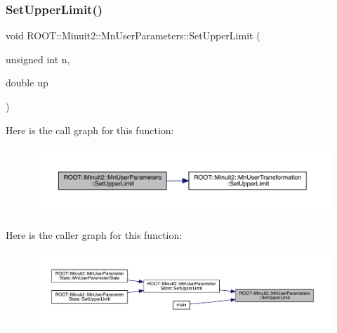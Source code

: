 \mbox{\label{classROOT_1_1Minuit2_1_1MnUserParameters_a9127811ac07731aea64f1869a620d11b}} 
\subsubsection{\texorpdfstring{SetUpperLimit()}{SetUpperLimit()}\hspace{0.1cm}{\footnotesize\ttfamily [2/4]}}
{\footnotesize\ttfamily void R\+O\+O\+T\+::\+Minuit2\+::\+Mn\+User\+Parameters\+::\+Set\+Upper\+Limit (\begin{DoxyParamCaption}\item[{unsigned int}]{n,  }\item[{double}]{up }\end{DoxyParamCaption})}

Here is the call graph for this function\+:\nopagebreak
\begin{figure}[H]
\begin{center}
\leavevmode
\includegraphics[width=350pt]{d6/d10/classROOT_1_1Minuit2_1_1MnUserParameters_a9127811ac07731aea64f1869a620d11b_cgraph}
\end{center}
\end{figure}
Here is the caller graph for this function\+:\nopagebreak
\begin{figure}[H]
\begin{center}
\leavevmode
\includegraphics[width=350pt]{d6/d10/classROOT_1_1Minuit2_1_1MnUserParameters_a9127811ac07731aea64f1869a620d11b_icgraph}
\end{center}
\end{figure}
\mbox{\label{classROOT_1_1Minuit2_1_1MnUserParameters_afc550532eeecdcb361f4c707032067e7}} 
